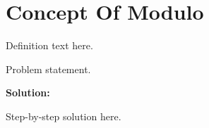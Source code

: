 \section{Concept Of Modulo}


\begin{definition}[Term]
Definition text here.
\end{definition}

\begin{example}
Problem statement.

\textbf{Solution:}

Step-by-step solution here.
\end{example}
